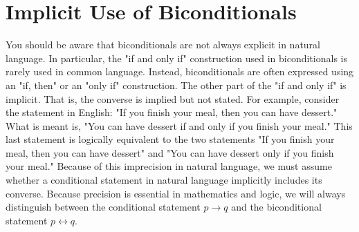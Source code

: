 \documentclass{Axon}
\begin{document}
\section{Implicit Use of Biconditionals}
You should be aware that biconditionals are not always explicit in natural language. In particular, the "if and only if" construction used in biconditionals is rarely used in common language. Instead, biconditionals are often expressed using an "if, then" or an "only if" construction. The other part of the "if and only if" is implicit. That is, the converse is implied but not stated. For example, consider the statement in English: "If you finish your meal, then you can have dessert." What is meant is, "You can have dessert if and only if you finish your meal." This last statement is logically equivalent to the two statements "If you finish your meal, then you can have dessert" and "You can have dessert only if you finish your meal." Because of this imprecision in natural language, we must assume whether a conditional statement in natural language implicitly includes its converse. Because precision is essential in mathematics and logic, we will always distinguish between the conditional statement \(p \to q\) and the biconditional statement \(p \leftrightarrow q\).

\printbibliography
\end{document}
